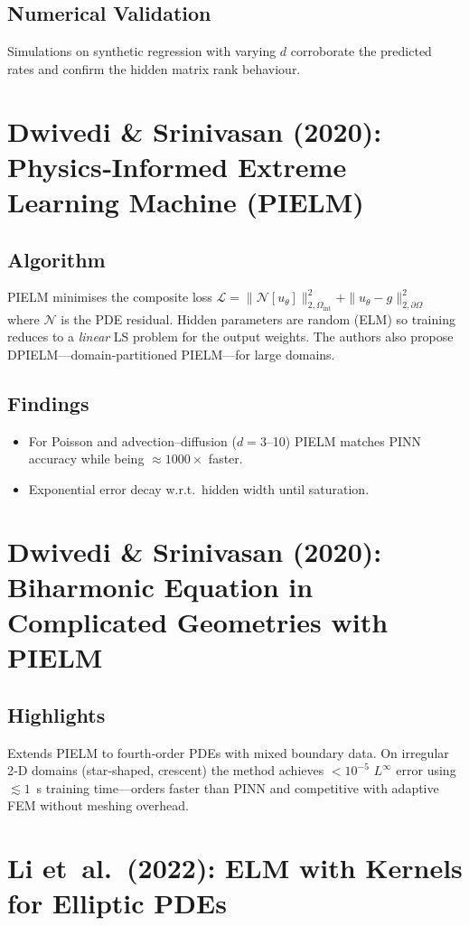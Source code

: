 \documentclass{article}
\begin{document}
\subsection*{Numerical Validation}
Simulations on synthetic regression with varying $d$ corroborate the predicted rates and confirm the hidden matrix rank behaviour.

\section{Dwivedi \& Srinivasan (2020): Physics‑Informed Extreme Learning Machine (PIELM)}
\subsection*{Algorithm}
PIELM minimises the composite loss
\(
\mathcal L=\| \mathcal N[u_\theta]\|_{2,\Omega_{\text{int}}}^2+\|u_\theta-g\|_{2,\partial\Omega}^2
\)
where $\mathcal N$ is the PDE residual. Hidden parameters are random (ELM) so training reduces to a \emph{linear} LS problem for the output weights.  The authors also propose DPIELM—domain‑partitioned PIELM—for large domains.

\subsection*{Findings}
\begin{itemize}
\item For Poisson and advection–diffusion ($d=3$–10) PIELM matches PINN accuracy while being $\approx1000\times$ faster.
\item Exponential error decay w.r.t.\ hidden width until saturation.
\end{itemize}

\section{Dwivedi \& Srinivasan (2020): Biharmonic Equation in Complicated Geometries with PIELM}
\subsection*{Highlights}
Extends PIELM to fourth‑order PDEs with mixed boundary data.  On irregular 2‑D domains (star‑shaped, crescent) the method achieves $<10^{-5}$ $L^\infty$ error using $\lesssim 1$ s training time—orders faster than PINN and competitive with adaptive FEM without meshing overhead.

\section{Li et al.\ (2022): ELM with Kernels for Elliptic PDEs}
\end{document}

